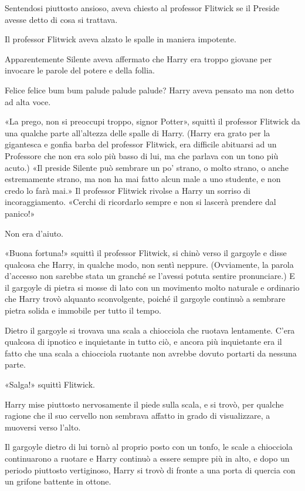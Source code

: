 Sentendosi piuttosto ansioso, aveva chiesto al professor Flitwick se il Preside avesse detto di cosa si trattava.

Il professor Flitwick aveva alzato le spalle in maniera impotente.

Apparentemente Silente aveva affermato che Harry era troppo giovane per invocare le parole del potere e della follia.

Felice felice bum bum palude palude palude? Harry aveva pensato ma non detto ad alta voce.

«La prego, non si preoccupi troppo, signor Potter», squittì il professor Flitwick da una qualche parte all’altezza delle spalle di Harry. (Harry era grato per la gigantesca e gonfia barba del professor Flitwick, era difficile abituarsi ad un Professore che non era solo più basso di lui, ma che parlava con un tono più acuto.) «Il preside Silente può sembrare un po’ strano, o molto strano, o anche estremamente strano, ma non ha mai fatto alcun male a uno studente, e non credo lo farà mai.» Il professor Flitwick rivolse a Harry un sorriso di incoraggiamento. «Cerchi di ricordarlo sempre e non si lascerà prendere dal panico!»

Non era d’aiuto.

«Buona fortuna!» squittì il professor Flitwick, si chinò verso il gargoyle e disse qualcosa che Harry, in qualche modo, non sentì neppure. (Ovviamente, la parola d’accesso non sarebbe stata un granché se l’avessi potuta sentire pronunciare.) E il gargoyle di pietra si mosse di lato con un movimento molto naturale e ordinario che Harry trovò alquanto sconvolgente, poiché il gargoyle continuò a sembrare pietra solida e immobile per tutto il tempo.

Dietro il gargoyle si trovava una scala a chiocciola che ruotava lentamente. C’era qualcosa di ipnotico e inquietante in tutto ciò, e ancora più inquietante era il fatto che una scala a chiocciola ruotante non avrebbe dovuto portarti da nessuna parte.

«Salga!» squittì Flitwick.

Harry mise piuttosto nervosamente il piede sulla scala, e si trovò, per qualche ragione che il suo cervello non sembrava affatto in grado di visualizzare, a muoversi verso l’alto.

Il gargoyle dietro di lui tornò al proprio posto con un tonfo, le scale a chiocciola continuarono a ruotare e Harry continuò a essere sempre più in alto, e dopo un periodo piuttosto vertiginoso, Harry si trovò di fronte a una porta di quercia con un grifone battente in ottone.


